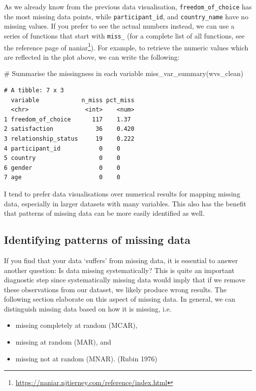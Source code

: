 \documentclass[
  letterpaper,
]{krantz}
\makeatletter
\newenvironment{Shaded}{\begin{snugshade}}{\end{snugshade}}
\newcommand{\CommentTok}[1]{\textcolor[rgb]{0.37,0.37,0.37}{#1}}
\newcommand{\FunctionTok}[1]{\textcolor[rgb]{0.28,0.35,0.67}{#1}}
\newcommand{\NormalTok}[1]{\textcolor[rgb]{0.00,0.23,0.31}{#1}}
\renewcommand{\href}[2]{#2\footnote{\url{#1}}}
\newenvironment{kframe}{%
\medskip{}
\setlength{\fboxsep}{.8em}
 \def\at@end@of@kframe{}%
 \ifinner\ifhmode%
  \def\at@end@of@kframe{\end{minipage}}%
  \begin{minipage}{\columnwidth}%
 \fi\fi%
 \def\FrameCommand##1{\hskip\@totalleftmargin \hskip-\fboxsep
 \colorbox{shadecolor}{##1}\hskip-\fboxsep
     \hskip-\linewidth \hskip-\@totalleftmargin \hskip\columnwidth}%
 \MakeFramed {\advance\hsize-\width
   \@totalleftmargin\z@ \linewidth\hsize
   \@setminipage}}%
 {\par\unskip\endMakeFramed%
 \at@end@of@kframe}
\renewenvironment{Shaded}{\begin{kframe}}{\end{kframe}}
\makeatother
\begin{document}
As we already know from the previous data visualisation,
\texttt{freedom\_of\_choice} has the most missing data points, while
\texttt{participant\_id}, and \texttt{country\_name} have no missing
values. If you prefer to see the actual numbers instead, we can use a
series of functions that start with \texttt{miss\_} (for a complete list
of all functions, see the
\href{https://naniar.njtierney.com/reference/index.html}{reference page
of naniar}). For example, to retrieve the numeric values which are
reflected in the plot above, we can write the following:

\begin{Shaded}
\begin{Highlighting}[]
\CommentTok{\# Summarise the missingness in each variable}
\FunctionTok{miss\_var\_summary}\NormalTok{(wvs\_clean)}
\end{Highlighting}
\end{Shaded}

\begin{verbatim}
# A tibble: 7 x 3
  variable            n_miss pct_miss
  <chr>                <int>    <num>
1 freedom_of_choice      117    1.37 
2 satisfaction            36    0.420
3 relationship_status     19    0.222
4 participant_id           0    0    
5 country                  0    0    
6 gender                   0    0    
7 age                      0    0    
\end{verbatim}

I tend to prefer data visualisations over numerical results for mapping
missing data, especially in larger datasets with many variables. This
also has the benefit that patterns of missing data can be more easily
identified as well.

\subsection{Identifying patterns of missing
data}\label{sec-patterns-of-missing-data}

If you find that your data `suffers' from missing data, it is essential
to answer another question: Is data missing systematically? This is
quite an important diagnostic step since systematically missing data
would imply that if we remove these observations from our dataset, we
likely produce wrong results. The following section elaborate on this
aspect of missing data. In general, we can distinguish missing data
based on how it is missing, i.e.

\begin{itemize}
\item
  missing completely at random (MCAR),
\item
  missing at random (MAR), and
\item
  missing not at random (MNAR). (Rubin 1976)
\end{itemize}
\end{document}
